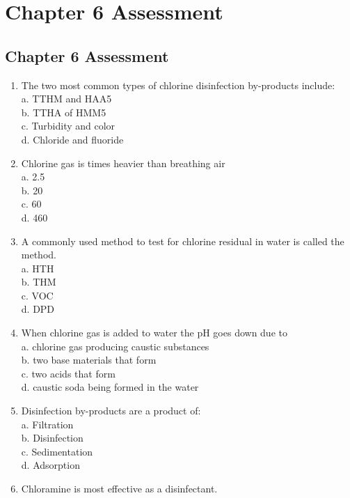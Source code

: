 
\chapter*{Chapter 6 Assessment}
\section*{Chapter 6 Assessment}
\begin{enumerate}[1.]

\item The two most common types of chlorine disinfection by-products include:\\
a. TTHM and HAA5\\
b. TTHA of HMM5\\
c. Turbidity and color\\
d. Chloride and fluoride\\
\item Chlorine gas is times heavier than breathing air\\
a. 2.5\\
b. 20\\
c. 60\\
d. 460\\
\item A commonly used method to test for chlorine residual in water is called the method.\\
a. HTH\\
b. THM\\
c. VOC\\
d. DPD\\
\item When chlorine gas is added to water the pH goes down due to\\
a. chlorine gas producing caustic substances\\
b. two base materials that form\\
c. two acids that form\\
d. caustic soda being formed in the water\\
\item Disinfection by-products are a product of:\\
a. Filtration\\
b. Disinfection\\
c. Sedimentation\\
d. Adsorption\\
\item Chloramine is most effective as a disinfectant.\\

\end{enumerate}
